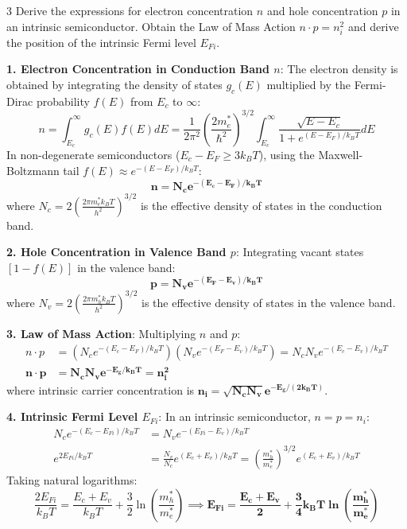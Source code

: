 \begin{theoryq}{3}
Derive the expressions for electron concentration $n$ and hole concentration $p$ in an intrinsic semiconductor. Obtain the Law of Mass Action $n \cdot p = n_i^2$ and derive the position of the intrinsic Fermi level $E_{Fi}$.
\end{theoryq}
\begin{theorysol}
\textbf{1. Electron Concentration in Conduction Band $n$}:
The electron density is obtained by integrating the density of states $g_c(E)$ multiplied by the Fermi-Dirac probability $f(E)$ from $E_c$ to $\infty$:
\begin{equation}
n = \int_{E_c}^\infty g_c(E) f(E) dE = \frac{1}{2\pi^2}\left(\frac{2m_e^*}{\hbar^2}\right)^{3/2} \int_{E_c}^\infty \frac{\sqrt{E - E_c}}{1 + e^{(E - E_F)/k_BT}} dE
\end{equation}
In non-degenerate semiconductors ($E_c - E_F \ge 3k_BT$), using the Maxwell-Boltzmann tail $f(E) \approx e^{-(E - E_F)/k_BT}$:
\begin{equation}
\mathbf{n = N_c e^{-(E_c - E_F)/k_BT}}
\end{equation}
where $N_c = 2\left(\frac{2\pi m_e^* k_BT}{h^2}\right)^{3/2}$ is the effective density of states in the conduction band.

\textbf{2. Hole Concentration in Valence Band $p$}:
Integrating vacant states $[1 - f(E)]$ in the valence band:
\begin{equation}
\mathbf{p = N_v e^{-(E_F - E_v)/k_BT}}
\end{equation}
where $N_v = 2\left(\frac{2\pi m_h^* k_BT}{h^2}\right)^{3/2}$ is the effective density of states in the valence band.

\textbf{3. Law of Mass Action}:
Multiplying $n$ and $p$:
\begin{align*}
n \cdot p &= \left(N_c e^{-(E_c - E_F)/k_BT}\right)\left(N_v e^{-(E_F - E_v)/k_BT}\right) = N_c N_v e^{-(E_c - E_v)/k_BT} \\
\mathbf{n \cdot p} &= \mathbf{N_c N_v e^{-E_g / k_BT} = n_i^2}
\end{align*}
where intrinsic carrier concentration is $\mathbf{n_i = \sqrt{N_c N_v} e^{-E_g / (2k_BT)}}$.

\textbf{4. Intrinsic Fermi Level $E_{Fi}$}:
In an intrinsic semiconductor, $n = p = n_i$:
\begin{align*}
N_c e^{-(E_c - E_{Fi})/k_BT} &= N_v e^{-(E_{Fi} - E_v)/k_BT} \\
e^{2E_{Fi}/k_BT} &= \frac{N_v}{N_c} e^{(E_c + E_v)/k_BT} = \left(\frac{m_h^*}{m_e^*}\right)^{3/2} e^{(E_c + E_v)/k_BT}
\end{align*}
Taking natural logarithms:
\begin{equation}
\frac{2E_{Fi}}{k_BT} = \frac{E_c + E_v}{k_BT} + \frac{3}{2}\ln\left(\frac{m_h^*}{m_e^*}\right) \implies \mathbf{E_{Fi} = \frac{E_c + E_v}{2} + \frac{3}{4}k_BT \ln\left(\frac{m_h^*}{m_e^*}\right)}
\end{equation}
\end{theorysol}
\vspace{4mm}

